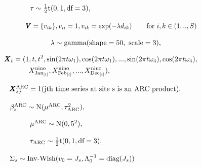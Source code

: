 \documentclass[12pt]{article}
\def\bX{\pmb{X}}
\def\bV{\pmb{V}}
\begin{document}
$\hspace{1.7in}
\tau \sim \frac{1}{2}\text{t}(0, 1, \text{df} = 3),
$

$\hspace{1.7in}
\bV=\{v_{ik}\}, v_{ii}=1, v_{ik} = \exp(-\lambda d_{ik}) \hspace{0.3in} \text{for $i,k \in (1,..,S)$}
$

$\hspace{2.1in}
\lambda \sim \text{gamma}(\text{shape} = 50, \text{ scale} = 3),
$


\vspace{-0.4in}
\begin{align*}
\hspace{1.2in}
\bX_t &= (1, t, t^2, \sin(2\pi t \omega_1), \cos(2\pi t \omega_1),..., \sin(2\pi t \omega_4), \cos(2\pi t \omega_4), \\
& \hspace{0.3in} X^\text{nino}_{\text{Jan}_{[t]}}, X^\text{nino}_{\text{Feb}_{[t]}}, ..., X^\text{nino}_{\text{Dec}_{[t]}}),
\end{align*}

\vspace{-0.2in}
$\hspace{1.3in}
\bX^\text{ARC}_{sj} = 1(\text{jth time series at site s is an ARC product}),
$

$\hspace{1.3in}
\beta^\text{ARC}_s \sim \text{N}(\mu^\text{ARC}, \tau^2_\text{ARC}),
$

$\hspace{1.7in}
\mu^\text{ARC} \sim \text{N}(0, 5^2),
$

$\hspace{1.7in}
\tau_\text{ARC} \sim \frac{1}{2}\text{t}(0, 1, \text{df} = 3),
$

$\hspace{1.3in}
\Sigma_s \sim \text{Inv-Wish}(v_0 = J_s, \Lambda_0^{-1} = \text{diag}(J_s))
$
\end{document}
